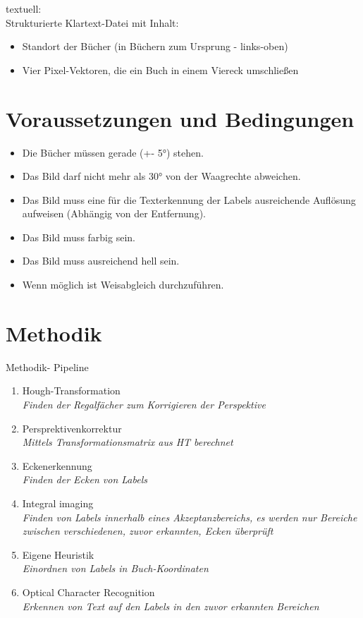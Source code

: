\documentclass[deutsch]{scrartcl}
\begin{document}
\noindent textuell:\\
Strukturierte Klartext-Datei mit Inhalt:
\begin{itemize}
  \item Standort der Bücher (in Büchern zum Ursprung - links-oben)
  \item Vier Pixel-Vektoren, die ein Buch in einem Viereck umschließen
\end{itemize}

\section{Voraussetzungen und Bedingungen}

\begin{itemize}
  \item Die Bücher müssen gerade (+- 5°) stehen.
  \item Das Bild darf nicht mehr als 30° von der Waagrechte abweichen.
  \item Das Bild muss eine für die Texterkennung der Labels ausreichende Auflösung aufweisen (Abhängig von der Entfernung).
  \item Das Bild muss farbig sein.
  \item Das Bild muss ausreichend hell sein. 
  \item Wenn möglich ist Weisabgleich durchzuführen.
  
  
\end{itemize}
\section{Methodik}
Methodik- Pipeline
\begin{enumerate}
	\item Hough-Transformation\\
		\textit{Finden der Regalfächer zum Korrigieren der Perspektive}
	\item Persprektivenkorrektur\\
		\textit{Mittels Transformationsmatrix aus HT berechnet}
	\item Eckenerkennung\\
		\textit{Finden der Ecken von Labels}
	\item Integral imaging\\
		\textit{Finden von Labels innerhalb eines Akzeptanzbereichs, es werden nur Bereiche zwischen verschiedenen, zuvor erkannten, Ecken überprüft}
	\item Eigene Heuristik\\
		\textit{Einordnen von Labels in Buch-Koordinaten}
	\item Optical Character Recognition\\
		\textit{Erkennen von Text auf den Labels in den zuvor erkannten Bereichen}
\end{enumerate}
\end{document}
